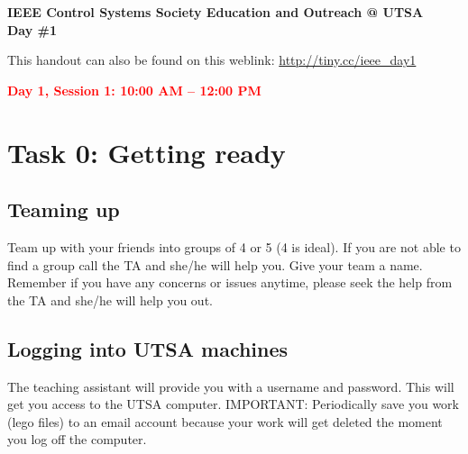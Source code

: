 \documentclass[11pt]{article}
\def\bluehref#1#2{\href{#1}{\color{blue} #2}}
\begin{document}
\begin{center}
{ \Large \bfseries IEEE Control Systems Society Education and Outreach @ UTSA}\\[0.4cm]
{ \large \bfseries Day \#1}\\[0.2cm]
\end{center}

%
\noindent This handout can also be found on this weblink: \bluehref{http://tiny.cc/ieee\_day1}{http://tiny.cc/ieee\_day1}

\vspace{0.5cm}
\noindent \textcolor{red}{\bf\Large Day 1, Session 1: 10:00 AM -- 12:00 PM} 
\section*{Task 0: Getting ready}
\subsection*{Teaming up}
Team up with your friends into groups of 4 or 5 (4 is ideal). If you are not able to find a group call the TA and she/he will help you. Give your team a name. 
Remember if you have any concerns or issues anytime, please seek the help from the TA and she/he will help you out.

\subsection*{Logging into UTSA machines}
The teaching assistant will provide you with a username and password. This will get you access to the UTSA computer. IMPORTANT: Periodically save you work (lego files) to an email account because your work will get deleted the moment you log off the computer.
\end{document}
